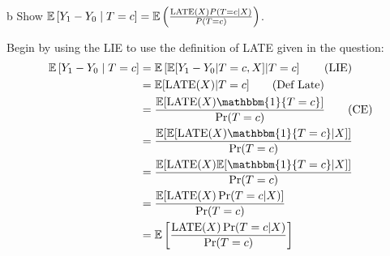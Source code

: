\documentclass{article}
\begin{document}
\begin{problem}{b}
Show $\mathbb{E}\left[Y_{1}-Y_{0} \mid T=c\right]=\mathbb{E}\left(\frac{\operatorname{LATE}(X) P(T=c \mid X)}{P(T=c)}\right)$.
\end{problem}
\begin{solution}
Begin by using the LIE to use the definition of LATE given in the question:
\begin{align*}
    \E\left[Y_{1}-Y_{0} \mid T=c\right] &= \E\left[\E[Y_1-Y_0\vert T=c, X]\vert T=c \right] \tag{LIE}\\ &= \E[\text{LATE}(X)\vert T=c] \tag{Def Late} \\
    &= \frac{\E[\text{LATE}(X)\mathbbm{1}\{T=c\}]}{\Pr(T=c)} \tag{CE} \\ 
    &= \frac{\E[\E[\text{LATE}(X)\mathbbm{1}\{T=c\}\vert X]]}{\Pr(T=c)} \\ 
    &= \frac{\E[\text{LATE}(X)\E[\mathbbm{1}\{T=c\}\vert X]]}{\Pr(T=c)} \\ 
    &=\frac{\E[\text{LATE}(X)\Pr(T=c\vert X)]}{\Pr(T=c)} \\ 
    &=\E\left[\frac{\text{LATE}(X)\Pr(T=c\vert X)}{\Pr(T=c)}\right]
\end{align*}
\end{solution}
\end{document}
